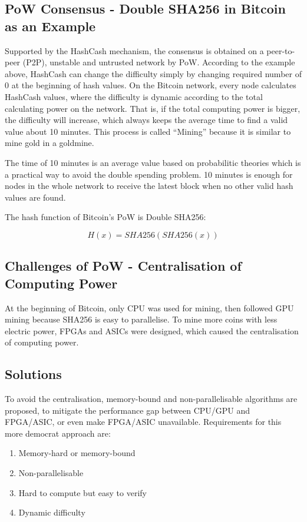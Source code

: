 \documentclass[11pt]{article}
\begin{document}
\subsection{PoW Consensus - Double SHA256 in Bitcoin as an Example}

Supported by the HashCash mechanism, the consensus is obtained on a peer-to-peer (P2P), unstable and untrusted network by PoW. According to the example above, HashCash can change the difficulty simply by changing required number of 0 at the beginning of hash values. On the Bitcoin network, every node calculates HashCash values, where the difficulty is dynamic according to the total calculating power on the network. That is, if the total computing power is bigger, the difficulty will increase, which always keeps the average time to find a valid value about 10 minutes. This process is called ``Mining'' because it is similar to mine gold in a goldmine.

The time of 10 minutes is an average value based on probabilitic theories which is a practical way to avoid the double spending problem. 10 minutes is enough for nodes in the whole network to receive the latest block when no other valid hash values are found.

The hash function of Bitcoin's PoW is Double SHA256:

\[ H(x) = SHA256(SHA256(x)) \]

\subsection{Challenges of PoW - Centralisation of Computing Power}

At the beginning of Bitcoin, only CPU was used for mining, then followed GPU mining because SHA256 is easy to parallelise. To mine more coins with less electric power, FPGAs and ASICs were designed, which caused the centralisation of computing power. 

\subsection{Solutions}

To avoid the centralisation, memory-bound and non-parallelisable algorithms are proposed,  to mitigate the performance gap between CPU/GPU and FPGA/ASIC, or even make FPGA/ASIC unavailable. Requirements for this more democrat approach are:

\begin{enumerate}
\item Memory-hard or memory-bound
\item Non-parallelisable
\item Hard to compute but easy to verify
\item Dynamic difficulty
\end{enumerate}
\end{document}
